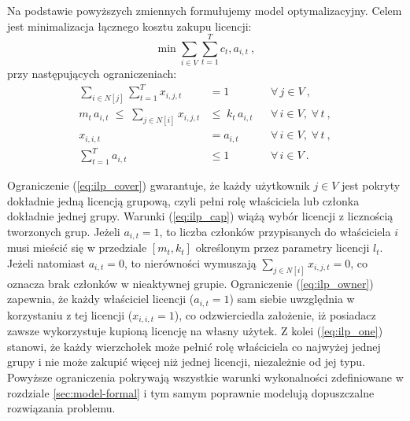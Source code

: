 Na podstawie powyższych zmiennych formułujemy model optymalizacyjny. Celem jest minimalizacja łącznego kosztu zakupu licencji:
\begin{equation}\label{eq:ilp_obj}
\min \sum_{i \in V}\sum_{t=1}^{T} c_t,a_{i,t}~,
\end{equation}
przy następujących ograniczeniach:
\begin{align}
  \sum_{i \in N[j]} \sum_{t=1}^{T} x_{i,j,t} &= 1 
    && \forall\, j \in V~, \label{eq:ilp_cover}\\[1ex]
  m_t\,a_{i,t} \;\le\; \sum_{j \in N[i]} x_{i,j,t} &\le\; k_t\,a_{i,t} 
    && \forall\, i \in V,\;\forall\, t~, \label{eq:ilp_cap}\\[1ex]
  x_{i,i,t} &= a_{i,t} 
    && \forall\, i \in V,\;\forall\, t~, \label{eq:ilp_owner}\\[1ex]
  \sum_{t=1}^{T} a_{i,t} &\le 1 
    && \forall\, i \in V~. \label{eq:ilp_one}
\end{align}


Ograniczenie (\ref{eq:ilp_cover}) gwarantuje, że każdy użytkownik $j \in V$ jest pokryty dokładnie jedną licencją grupową, czyli pełni rolę właściciela lub członka dokładnie jednej grupy. Warunki (\ref{eq:ilp_cap}) wiążą wybór licencji z licznością tworzonych grup. Jeżeli $a_{i,t}=1$, to liczba członków przypisanych do właściciela $i$ musi mieścić się w przedziale $[m_t,k_t]$ określonym przez parametry licencji $l_t$. Jeżeli natomiast $a_{i,t}=0$, to nierówności wymuszają $\sum_{j \in N[i]} x_{i,j,t} = 0$, co oznacza brak członków w nieaktywnej grupie. Ograniczenie (\ref{eq:ilp_owner}) zapewnia, że każdy właściciel licencji ($a_{i,t}=1$) sam siebie uwzględnia w korzystaniu z tej licencji ($x_{i,i,t}=1$), co odzwierciedla założenie, iż posiadacz zawsze wykorzystuje kupioną licencję na własny użytek. Z kolei (\ref{eq:ilp_one}) stanowi, że każdy wierzchołek może pełnić rolę właściciela co najwyżej jednej grupy i nie może zakupić więcej niż jednej licencji, niezależnie od jej typu. Powyższe ograniczenia pokrywają wszystkie warunki wykonalności zdefiniowane w rozdziale \ref{sec:model-formal} i tym samym poprawnie modelują dopuszczalne rozwiązania problemu.

